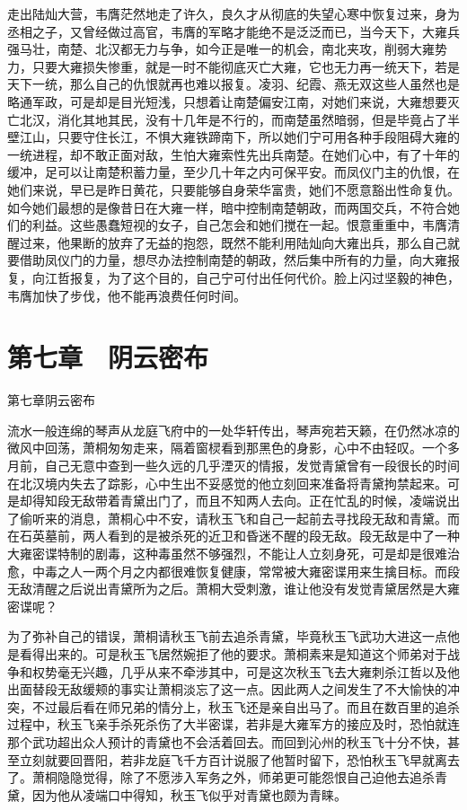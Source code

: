走出陆灿大营，韦膺茫然地走了许久，良久才从彻底的失望心寒中恢复过来，身为丞相之子，又曾经做过高官，韦膺的军略才能绝不是泛泛而已，当今天下，大雍兵强马壮，南楚、北汉都无力与争，如今正是唯一的机会，南北夹攻，削弱大雍势力，只要大雍损失惨重，就是一时不能彻底灭亡大雍，它也无力再一统天下，若是天下一统，那么自己的仇恨就再也难以报复。凌羽、纪霞、燕无双这些人虽然也是略通军政，可是却是目光短浅，只想着让南楚偏安江南，对她们来说，大雍想要灭亡北汉，消化其地其民，没有十几年是不行的，而南楚虽然暗弱，但是毕竟占了半壁江山，只要守住长江，不惧大雍铁蹄南下，所以她们宁可用各种手段阻碍大雍的一统进程，却不敢正面对敌，生怕大雍索性先出兵南楚。在她们心中，有了十年的缓冲，足可以让南楚积蓄力量，至少几十年之内可保平安。而凤仪门主的仇恨，在她们来说，早已是昨日黄花，只要能够自身荣华富贵，她们不愿意豁出性命复仇。如今她们最想的是像昔日在大雍一样，暗中控制南楚朝政，而两国交兵，不符合她们的利益。这些愚蠢短视的女子，自己怎会和她们搅在一起。恨意重重中，韦膺清醒过来，他果断的放弃了无益的抱怨，既然不能利用陆灿向大雍出兵，那么自己就要借助凤仪门的力量，想尽办法控制南楚的朝政，然后集中所有的力量，向大雍报复，向江哲报复，为了这个目的，自己宁可付出任何代价。脸上闪过坚毅的神色，韦膺加快了步伐，他不能再浪费任何时间。

\chapter{第七章　阴云密布}

第七章阴云密布

流水一般连绵的琴声从龙庭飞府中的一处华轩传出，琴声宛若天籁，在仍然冰凉的微风中回荡，萧桐匆匆走来，隔着窗棂看到那黑色的身影，心中不由轻叹。一个多月前，自己无意中查到一些久远的几乎湮灭的情报，发觉青黛曾有一段很长的时间在北汉境内失去了踪影，心中生出不妥感觉的他立刻回来准备将青黛拘禁起来。可是却得知段无敌带着青黛出门了，而且不知两人去向。正在忙乱的时候，凌端说出了偷听来的消息，萧桐心中不安，请秋玉飞和自己一起前去寻找段无敌和青黛。而在石英墓前，两人看到的是被杀死的近卫和昏迷不醒的段无敌。段无敌是中了一种大雍密谍特制的剧毒，这种毒虽然不够强烈，不能让人立刻身死，可是却是很难治愈，中毒之人一两个月之内都很难恢复健康，常常被大雍密谍用来生擒目标。而段无敌清醒之后说出青黛所为之后。萧桐大受刺激，谁让他没有发觉青黛居然是大雍密谍呢？

为了弥补自己的错误，萧桐请秋玉飞前去追杀青黛，毕竟秋玉飞武功大进这一点他是看得出来的。可是秋玉飞居然婉拒了他的要求。萧桐素来是知道这个师弟对于战争和权势毫无兴趣，几乎从来不牵涉其中，可是这次秋玉飞去大雍刺杀江哲以及他出面替段无敌缓颊的事实让萧桐淡忘了这一点。因此两人之间发生了不大愉快的冲突，不过最后看在师兄弟的情分上，秋玉飞还是亲自出马了。而且在数百里的追杀过程中，秋玉飞亲手杀死杀伤了大半密谍，若非是大雍军方的接应及时，恐怕就连那个武功超出众人预计的青黛也不会活着回去。而回到沁州的秋玉飞十分不快，甚至立刻就要回晋阳，若非龙庭飞千方百计说服了他暂时留下，恐怕秋玉飞早就离去了。萧桐隐隐觉得，除了不愿涉入军务之外，师弟更可能怨恨自己迫他去追杀青黛，因为他从凌端口中得知，秋玉飞似乎对青黛也颇为青睐。

